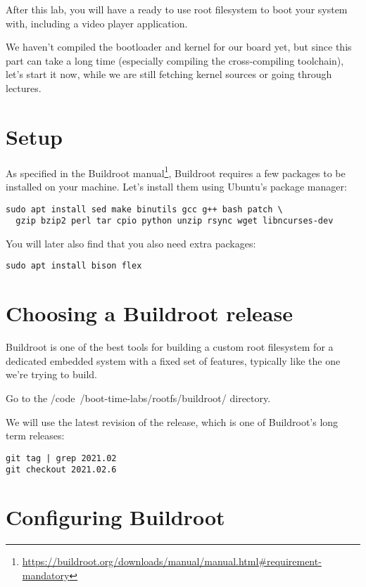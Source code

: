 
After this lab, you will have a ready to use root filesystem to boot
your system with, including a video player application.

We haven't compiled the bootloader and kernel for our board yet,
but since this part can take a long time (especially compiling the
cross-compiling toolchain), let's start it now, while we are still
fetching kernel sources or going through lectures.

\section{Setup}

As specified in the Buildroot
manual\footnote{\url{https://buildroot.org/downloads/manual/manual.html\#requirement-mandatory}},
Buildroot requires a few packages to be installed on your
machine. Let's install them using Ubuntu's package manager:

\begin{verbatim}
sudo apt install sed make binutils gcc g++ bash patch \
  gzip bzip2 perl tar cpio python unzip rsync wget libncurses-dev
\end{verbatim}

You will later also find that you also need extra packages:

\begin{verbatim}
sudo apt install bison flex
\end{verbatim}

\section{Choosing a Buildroot release}

Buildroot is one of the best tools for building a custom root filesystem
for a dedicated embedded system with a fixed set of features, typically
like the one we're trying to build.

Go to the /code{~/boot-time-labs/rootfs/buildroot/} directory.

We will use the latest revision of the  release, which is
one of Buildroot's long term releases:

\begin{verbatim}
git tag | grep 2021.02
git checkout 2021.02.6
\end{verbatim}

\section{Configuring Buildroot}

